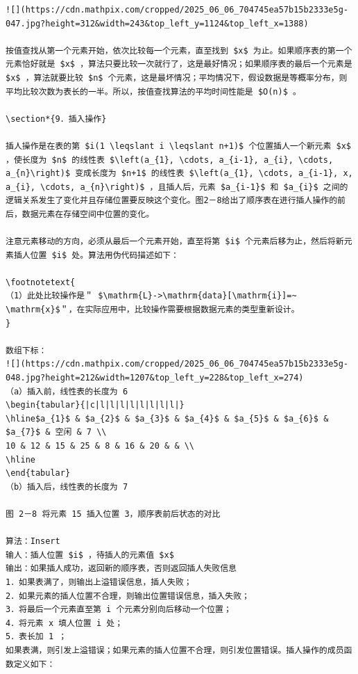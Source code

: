 \documentclass[10pt]{article}
\let\svthefootnote\thefootnote
\newcommand\blfootnotetext[1]{%
  \let\thefootnote\relax\footnote{#1}%
  \addtocounter{footnote}{-1}%
  \let\thefootnote\svthefootnote%
}
\let\svfootnotetext\footnotetext
\renewcommand\footnotetext[2][?]{%
  \if\relax#1\relax%
    \ifnum\value{footnote}=0\blfootnotetext{#2}\else\svfootnotetext{#2}\fi%
  \else%
    \if?#1\ifnum\value{footnote}=0\blfootnotetext{#2}\else\svfootnotetext{#2}\fi%
    \else\svfootnotetext[#1]{#2}\fi%
  \fi
}
\begin{document}
\begin{verbatim}
![](https://cdn.mathpix.com/cropped/2025_06_06_704745ea57b15b2333e5g-047.jpg?height=312&width=243&top_left_y=1124&top_left_x=1388)

按值查找从第一个元素开始，依次比较每一个元素，直至找到 $x$ 为止。如果顺序表的第一个元素恰好就是 $x$ ，算法只要比较一次就行了，这是最好情况；如果顺序表的最后一个元素是 $x$ ，算法就要比较 $n$ 个元素，这是最坏情况；平均情况下，假设数据是等概率分布，则平均比较次数为表长的一半。所以，按值查找算法的平均时间性能是 $O(n)$ 。

\section*{9．插入操作}

插人操作是在表的第 $i(1 \leqslant i \leqslant n+1)$ 个位置插人一个新元素 $x$ ，使长度为 $n$ 的线性表 $\left(a_{1}, \cdots, a_{i-1}, a_{i}, \cdots, a_{n}\right)$ 变成长度为 $n+1$ 的线性表 $\left(a_{1}, \cdots, a_{i-1}, x, a_{i}, \cdots, a_{n}\right)$ ，且插人后，元素 $a_{i-1}$ 和 $a_{i}$ 之间的逻辑关系发生了变化并且存储位置要反映这个变化。图2－8给出了顺序表在进行插人操作的前后，数据元素在存储空间中位置的变化。

注意元素移动的方向，必须从最后一个元素开始，直至将第 $i$ 个元素后移为止，然后将新元素插人位置 $i$ 处。算法用伪代码描述如下：

\footnotetext{
（1）此处比较操作是＂ $\mathrm{L}->\mathrm{data}[\mathrm{i}]=~ \mathrm{x}$＂，在实际应用中，比较操作需要根据数据元素的类型重新设计。
}

数组下标：
![](https://cdn.mathpix.com/cropped/2025_06_06_704745ea57b15b2333e5g-048.jpg?height=212&width=1207&top_left_y=228&top_left_x=274)
（a）插入前，线性表的长度为 6
\begin{tabular}{|c|l|l|l|l|l|l|l|l|}
\hline$a_{1}$ & $a_{2}$ & $a_{3}$ & $a_{4}$ & $a_{5}$ & $a_{6}$ & $a_{7}$ & 空闲 & 7 \\
10 & 12 & 15 & 25 & 8 & 16 & 20 & & \\
\hline
\end{tabular}
（b）插入后，线性表的长度为 7

图 2－8 将元素 15 插入位置 3，顺序表前后状态的对比

算法：Insert
输人：插人位置 $i$ ，待插人的元素值 $x$
输出：如果插人成功，返回新的顺序表，否则返回插人失败信息
1．如果表满了，则输出上溢错误信息，插人失败；
2．如果元素的插人位置不合理，则输出位置错误信息，插入失败；
3．将最后一个元素直至第 i 个元素分别向后移动一个位置；
4．将元素 x 填人位置 i 处；
5．表长加 1 ；
如果表满，则引发上溢错误；如果元素的插人位置不合理，则引发位置错误。插人操作的成员函数定义如下：
\end{verbatim}
\end{document}
